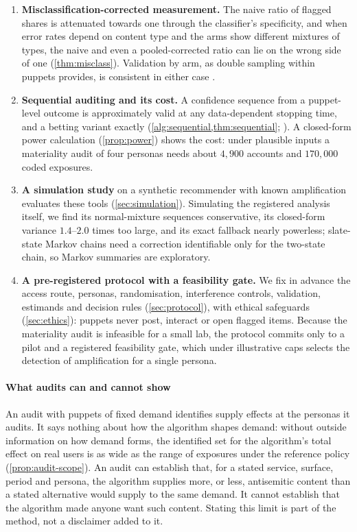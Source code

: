 \begin{enumerate}[label=\textbf{C\arabic*},ref=C\arabic*,leftmargin=2.4em,itemsep=2pt]
  \item\label{contrib:misclass} \textbf{Misclassification-corrected
  measurement.} The naive ratio of flagged shares is attenuated towards one
  through the classifier's specificity, and when error rates depend on content
  type and the arms show different mixtures of types, the naive and even a
  pooled-corrected ratio can lie on the wrong side of one
  (\cref{thm:misclass}). Validation by arm, as double sampling within puppets
  provides, is consistent in either case \citep{rogangladen1978,neyman1938}.
  \item\label{contrib:sequential} \textbf{Sequential auditing and its cost.} A
  confidence sequence from a puppet-level outcome is approximately valid at
  any data-dependent stopping time, and a betting variant exactly
  (\cref{alg:sequential,thm:sequential};
  \citealp{wald1945,howard2021,ramdas2023}). A closed-form power calculation
  (\cref{prop:power}) shows the cost: under plausible inputs a materiality
  audit of four personas needs about $4{,}900$ accounts and $170{,}000$ coded
  exposures.
  \item\label{contrib:sim} \textbf{A simulation study} on a synthetic
  recommender with known amplification evaluates these tools
  (\cref{sec:simulation}). Simulating the registered analysis itself, we find
  its normal-mixture sequences conservative, its closed-form variance
  $1.4$--$2.0$ times too large, and its exact fallback nearly powerless;
  slate-state Markov chains need a correction identifiable only for the
  two-state chain, so Markov summaries are exploratory.
  \item\label{contrib:protocol} \textbf{A pre-registered protocol with a
  feasibility gate.} We fix in advance the access route, personas,
  randomisation, interference controls, validation, estimands and decision
  rules (\cref{sec:protocol}), with ethical safeguards (\cref{sec:ethics}):
  puppets never post, interact or open flagged items. Because the materiality
  audit is infeasible for a small lab, the protocol commits only to a pilot
  and a registered feasibility gate, which under illustrative caps selects
  the detection of amplification for a single persona.
\end{enumerate}

\paragraph{What audits can and cannot show}
An audit with puppets of fixed demand identifies supply effects at the
personas it audits. It says nothing about how the algorithm shapes demand:
without outside information on how demand forms, the identified set for the
algorithm's total effect on real users is as wide as the range of exposures
under the reference policy (\cref{prop:audit-scope}). An audit can establish
that, for a stated service, surface, period and persona, the algorithm
supplies more, or less, antisemitic content than a stated alternative would
supply to the same demand. It cannot establish that the algorithm made anyone
want such content. Stating this limit is part of the method, not a disclaimer
added to it.

